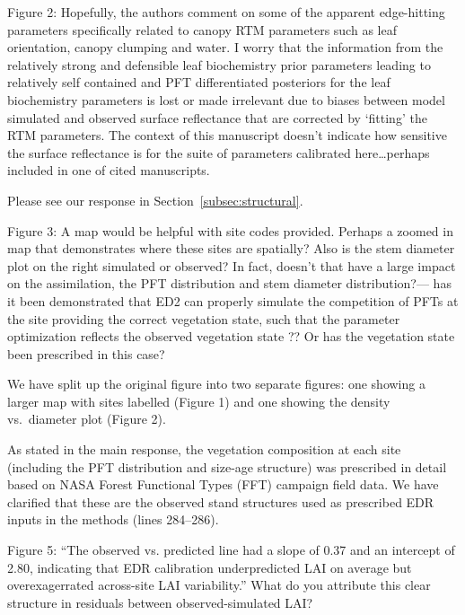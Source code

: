 \begin{reviewer}
  Figure 2: Hopefully, the authors comment on some of the apparent edge-hitting parameters specifically related to canopy RTM parameters such as leaf orientation, canopy clumping and water.
  I worry that the information from the relatively strong and defensible leaf biochemistry prior parameters leading to relatively self contained and PFT differentiated posteriors for the leaf biochemistry parameters is lost or made irrelevant due to biases between model simulated and observed surface reflectance that are corrected by ‘fitting’ the RTM parameters.
  The context of this manuscript doesn’t indicate how sensitive the surface reflectance is for the suite of parameters calibrated here\ldots perhaps included in one of cited manuscripts.
\end{reviewer}

Please see our response in Section~\ref{subsec:structural}.

\begin{reviewer}
  Figure 3: A map would be helpful with site codes provided. Perhaps a zoomed in map that demonstrates where these sites are spatially? Also is the stem diameter plot on the right simulated or observed? In fact, doesn’t that have a large impact on the assimilation, the PFT distribution and stem diameter distribution?— has it been demonstrated that ED2 can properly simulate the competition of PFTs at the site providing the correct vegetation state, such that the parameter optimization reflects the observed vegetation state ?? Or has the vegetation state been prescribed in this case?
\end{reviewer}

We have split up the original figure into two separate figures:
one showing a larger map with sites labelled (Figure 1) and one showing the density vs.\ diameter plot (Figure 2).

As stated in the main response, the vegetation composition at each site (including the PFT distribution and size-age structure) was prescribed in detail based on NASA Forest Functional Types (FFT) campaign field data.
We have clarified that these are the observed stand structures used as prescribed EDR inputs in the methods (lines 284--286).

\begin{reviewer}
  Figure 5: “The observed vs. predicted line had a slope of 0.37 and an intercept of 2.80, indicating that EDR calibration underpredicted LAI on average but overexagerrated across-site LAI variability.” What do you attribute this clear structure in residuals between observed-simulated LAI?
\end{reviewer}

